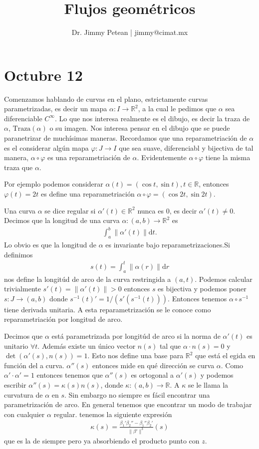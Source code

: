 \documentclass{article}
\title{Flujos geométricos}
\author{Dr. Jimmy Petean | jimmy@cimat.mx}
\theoremstyle{mytheoremstyle}
\theoremstyle{mytheoremstyle}
\theoremstyle{myproblemstyle}
\begin{document}
    \maketitle
    \section{Octubre 12}
  Comenzamos hablando de curvas en el plano, estrictamente curvas parametrizadas, es decir un mapa $\alpha: I \to \mathbb{R}^2$, a la cual le pedimos que $\alpha$ sea diferenciable $C^\infty$. Lo que nos interesa realmente es el dibujo, es decir la traza de $\alpha$, $\text{Traza}(\alpha)$ o su imagen. Nos interesa pensar en el dibujo que se puede paranetrizar de muchísimas maneras. Recordamos que una reparametriación de $\alpha$ es el considerar algún mapa $\varphi: J \to I$ que sea suave, diferenciabl y bijectiva  de tal manera, $\alpha\circ\varphi$ es una reparametriación de $\alpha$. Evidentemente $\alpha\circ\varphi$ tiene la misma traza que $\alpha$.

  Por ejemplo podemos considerar $\alpha(t)= (\cos t, \sin t), t\in \mathbb{R}$, entonces $\varphi(t)=2t$ es define una reparametriación $\alpha\circ\varphi=(\cos 2t, \sin 2t)$.


  Una curva $\alpha$ se dice regular si $\alpha'(t)\in \mathbb{R}^2$ nunca es $0$, es decir $\alpha'(t)\ne0$. Decimos que la longitud de una curva $\alpha: (a,b)\to \mathbb{R}^2$ es 
  \begin{align}
    \int_{a}^{b} \|\alpha'(t)\| \mathrm{d}t.
  \end{align}
  Lo obvio es que la longitud de $\alpha$ es invariante bajo reparametrizaciones.Si definimos 
  \begin{align}
    s(t)=\int_{a}^{t} \|\alpha(r)\|\mathrm{d}r
  \end{align}
  nos define la longitúd de arco de la curva restringida a $(a,t)$. Podemos calcular trivialmente $s'(t)=\|\alpha'(t)\| > 0$ entonces $s$ es bijectiva y podemos poner $s:J\to (a,b)$ donde $s^{-1}(t)' = 1/ (s'(s^{-1}(t)))$. Entonces tenemos $\alpha\circ s^{-1}$ tiene derivada unitaria. A esta reparametrización se le conoce como reparametriación por longitud de arco.

  Decimos que $\alpha$ está parametrizada por longitúd de arco si la norma de $\alpha'(t) $ es unitario $\forall t$. Además existe un único vector $n(s)$ tal que $\alpha\cdot n (s)=0$  y $\det{(\alpha'(s),n(s))}=1$. Esto nos define una base para $\mathbb{R}^2$ que está el egida en función del a curva. 
   $\alpha''(s)$ entonces mide en qué dirección se curva $\alpha$. Como $\alpha' \cdot \alpha'=1$ entonces tenemos que $\alpha''(s)$ es ortogonal a $\alpha'(s)$ y podemos escribir $\alpha''(s)=\kappa(s) n(s)$, donde $\kappa: (a,b)\to \mathbb{R}$. A $\kappa$ se le llama la curvatura de $\alpha$ en $s$.
   Sin embargo no siempre es fácil encontrar una parametrización de arco. En general tenemos que encontrar un modo de trabajar con cualquier $\alpha$ regular. tenemos la siguiente expresión 
   \begin{align}
      \kappa(s) =\frac{\beta_1'\beta_2''-\beta_1'' \beta_2 '}{\|\beta'\|^3}(s)
    \end{align}
    que es la de siempre pero ya absorbiendo el producto punto con $z$.
\end{document}
